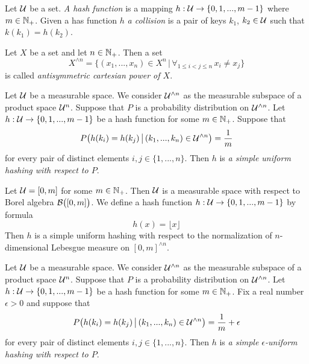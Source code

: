 \begin{definition}
Let ${\mathcal U}$ be a set. \textit{A hash function} is a mapping $h:{\mathcal U}\rightarrow \{0,1,...,m-1\}$ where $m\in {\mathbb N}_+$. Given a has function $h$ \textit{a collision} is a pair of keys $k_1$, $k_2\in {\mathcal U}$ such that $k(k_1) = h(k_2)$.
\end{definition}

\begin{definition}
Let $X$ be a set and let $n\in {\mathbb N}_+$. Then a set
$$X^{\wedge n} = \big\{(x_1,...,x_n)\in X^{n}\,\big|\,\forall_{1\leq i < j \leq n}\,x_i\neq x_j\big\}$$
is called \textit{antisymmetric cartesian power of $X$}.
\end{definition}

\begin{definition}
Let ${\mathcal U}$ be a measurable space. We consider ${\mathcal U}^{\wedge n}$ as the measurable subspace of a product space ${\mathcal U}^{n}$. Suppose that $P$ is a probability distribution on ${\mathcal U}^{\wedge n}$. Let $h:{\mathcal U}\rightarrow \{0,1,...,m-1\}$ be a hash function for some $m\in {\mathbb N}_+$. Suppose that
$$P\big(h(k_i) = h(k_j)\,\big|\,(k_1,...,k_n)\in {\mathcal U}^{\wedge n}\big) = \frac{1}{m}$$
for every pair of distinct elements $i,j\in \{1,...,n\}$.
Then $h$ is \textit{a simple uniform hashing with respect to $P$}.
\end{definition}

\begin{example}\label{example:real_interval_with_floor_hash_function_as_an_example_of_suh}
Let ${\mathcal U} = [0,m]$ for some $m\in {\mathbb N}_+$. Then ${\mathcal U}$ is a measurable space with respect to Borel algebra ${\mathcal B}\big([0,m]\big)$. We define a hash function $h:{\mathcal U}\rightarrow \{0,1,...,m-1\}$ by formula
$$h(x) = \lfloor x \rfloor$$
Then $h$ is a simple uniform hashing with respect to the normalization of $n$-dimensional Lebesgue measure on $[0,m]^{\wedge n}$.
\end{example}

\begin{definition}
Let ${\mathcal U}$ be a measurable space. We consider ${\mathcal U}^{\wedge n}$ as the measurable subspace of a product space ${\mathcal U}^{n}$. Suppose that $P$ is a probability distribution on ${\mathcal U}^{\wedge n}$. Let $h:{\mathcal U}\rightarrow \{0,1,...,m-1\}$ be a hash function for some $m\in {\mathbb N}_+$. Fix a real number $\epsilon > 0$ and suppose that
$$P\big(h(k_i) = h(k_j)\,\big|\,(k_1,...,k_n)\in {\mathcal U}^{\wedge n}\big) = \frac{1}{m} + \epsilon$$
for every pair of distinct elements $i,j\in \{1,...,n\}$.
Then $h$ is \textit{a simple $\epsilon$-uniform hashing with respect to $P$}.
\end{definition}

